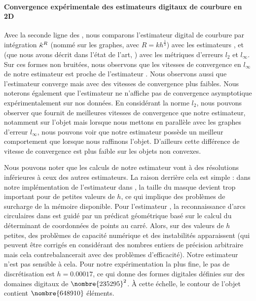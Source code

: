 \paragraph{Convergence expérimentale des estimateurs digitaux de courbure en 2D}
%
Avec la seconde ligne des
,
nous comparons l'estimateur digital de courbure par intégration $\hat{\kappa}^{R}$
(nommé \II sur les graphes, avec $R = kh^\frac{1}{3}$) avec les estimateurs \BC
\cite{Esbelin2011}, \MDSS \cite{Coeurjolly2001,deVieilleville2007} et \MDCA
\cite{Roussillon2011} (que nous avons décrit dans l'état de l'art,
) avec les métriques d'erreurs $l_2$ et
$l_\infty$. Sur ces formes non bruitées, nous observons que les vitesses de
convergence en $l_\infty$ de notre estimateur est proche de l'estimateur \MDCA.
Nous observons aussi que l'estimateur \BC converge mais avec des vitesses de
convergence plus faibles. Nous noterons également que l'estimateur \MDSS ne
n'affiche pas de convergence asymptotique expérimentalement sur nos données. En
considérant la norme $l_2$, nous pouvons observer que \BC fournit de meilleures
vitesses de convergence que notre estimateur, notamment sur l'objet \Ellipse
mais lorsque nous mettons en parallèle avec les graphes d'erreur $l_\infty$,
nous pouvons voir que notre estimateur possède un meilleur comportement que \BC
lorsque nous raffinons l'objet. D'ailleurs cette différence de vitesse de
convergence est plus faible sur les objets non convexes.


Nous pouvons noter que les calculs de notre estimateur vont à des résolutions
inférieures à ceux des autres estimateurs. La raison derrière cela est simple :
dans notre implémentation de l'estimateur \BC dans \DGtal, la taille du masque
devient trop important pour de petites valeurs de $h$, ce qui implique des
problèmes de surcharge de la mémoire disponible. Pour l'estimateur \MDCA, la
reconnaissance d'arcs circulaires dans \DGtal est guidé par un prédicat
géométrique basé sur le calcul du déterminant de coordonnées de points au carré.
Alors, sur des valeurs de $h$ petites, des problèmes de capacité numérique et
des instabilités apparaissent (qui peuvent être corrigés en considérant des
nombres entiers de précision arbitraire mais cela contrebalancerait avec des
problèmes d'efficacité). Notre estimateur n'est pas sensible à cela. Pour notre
expérimentation la plus fine, le pas de discrétisation est $h = 0.00017$, ce qui
donne des formes digitales définies sur des domaines digitaux de $\nombre{235295}^2$. À
cette échelle, le contour de l'objet \Ellipse contient $\nombre{648910}$ éléments.


